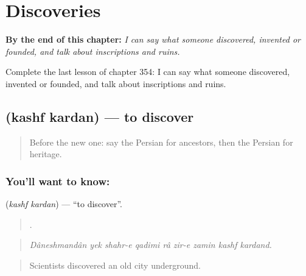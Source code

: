 
\chapter{Discoveries}
\label{ch:fa-discoveries}

\begin{chapteropening}
\textbf{By the end of this chapter:} \emph{I can say what someone discovered, invented or founded, and talk about inscriptions and ruins.}

Complete the last lesson of chapter 354: I can say what someone discovered, invented or founded, and talk about inscriptions and ruins.
\end{chapteropening}

\section[\texorpdfstring{\fa{کشف} \fa{کردن} (kashf kardan)}{کشف کردن (kashf kardan)}]{  (kashf kardan) — to discover}

\label{lesson:FA-C354-kashf-kardan}



\begin{quote}
Before the new one: say the Persian for ancestors, then the Persian for heritage.
\end{quote}

\subsection*{You'll want to know:  }
\textbf{ } (\emph{kashf kardan}) — \textquotedblleft{}to discover\textquotedblright{}.

\begin{quote}
        .
\end{quote}

\begin{quote}
\emph{Dâneshmandân yek shahr-e qadimi râ zir-e zamin kashf kardand.}
\end{quote}

\begin{quote}
Scientists discovered an old city underground.
\end{quote}

